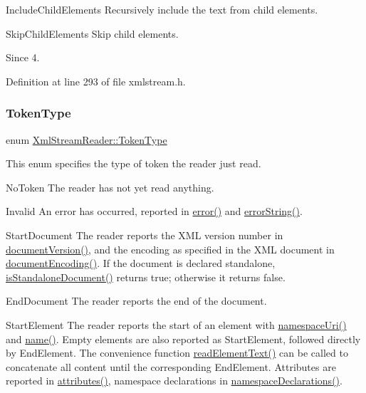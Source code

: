 Include\+Child\+Elements Recursively include the text from child elements.

Skip\+Child\+Elements Skip child elements.

\begin{DoxySince}{Since}
4. 
\end{DoxySince}


Definition at line 293 of file xmlstream.\+h.

\mbox{\label{class_xml_stream_reader_a99e2023f874f0ca648c996ae79c3b5f7}} 
\subsubsection{\texorpdfstring{Token\+Type}{TokenType}}
{\footnotesize\ttfamily enum \hyperlink{class_xml_stream_reader_a99e2023f874f0ca648c996ae79c3b5f7}{Xml\+Stream\+Reader\+::\+Token\+Type}}

This enum specifies the type of token the reader just read.

No\+Token The reader has not yet read anything.

Invalid An error has occurred, reported in \hyperlink{class_xml_stream_reader_ae9a7e8fe9f15b0f5c4ec5fa080c6249f}{error()} and \hyperlink{class_xml_stream_reader_a119d913daa2a7b8174f0b26dcd7e9720}{error\+String()}.

Start\+Document The reader reports the X\+ML version number in \hyperlink{class_xml_stream_reader_a6667b8f4c648c8f192802c8091f617fb}{document\+Version()}, and the encoding as specified in the X\+ML document in \hyperlink{class_xml_stream_reader_a8326fe20290e37d1c1549737cc02d25b}{document\+Encoding()}. If the document is declared standalone, \hyperlink{class_xml_stream_reader_aa5678c8de5e5efd67e85b60dbda6374f}{is\+Standalone\+Document()} returns {\ttfamily true}; otherwise it returns {\ttfamily false}.

End\+Document The reader reports the end of the document.

Start\+Element The reader reports the start of an element with \hyperlink{class_xml_stream_reader_a4ea3344f8632d1cd70edfaddf9a8027c}{namespace\+Uri()} and \hyperlink{class_xml_stream_reader_a09b44691e1e74daa6bdd4ed465d3c0a2}{name()}. Empty elements are also reported as Start\+Element, followed directly by End\+Element. The convenience function \hyperlink{class_xml_stream_reader_a45f936b88df1b72f39c43d1c41fb9940}{read\+Element\+Text()} can be called to concatenate all content until the corresponding End\+Element. Attributes are reported in \hyperlink{class_xml_stream_reader_aaa89a6baad93837857847a3ec5d7710a}{attributes()}, namespace declarations in \hyperlink{class_xml_stream_reader_a3e6033d64f3744d90e96287f3a04d913}{namespace\+Declarations()}.

